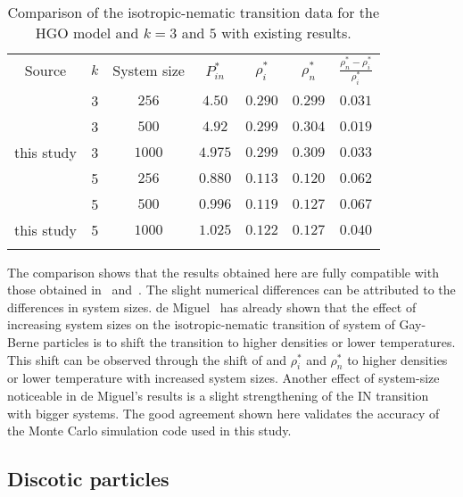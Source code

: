 \begin{table}
\centering
\begin{tabular}{||c||c||c||c||c||c||c||}
\hhline{|t:=:t:=:t:=:t:=:t:=:t:=:t:=:t|}
Source		&$k$	&System size	&$P^{*}_{in}$	&$\rho^{*}_i$	&$\rho^{*}_n$	&$\frac{\rho^{*}_n -\rho^{*}_i}{\rho^{*}_i}$	\\
\hhline{|:=::=::=::=::=::=::=:|}
\cite{PadillaVelasco97}	&3	&$256$	&$4.50$		&$0.290$	&$0.299$	&$0.031$	\\
\cite{DeMiguelDelRio01}	&3	&$500$	&$4.92$		&$0.299$	&$0.304$	&$0.019$	\\
this study		&3	&$1000$	&$4.975$	&$0.299$	&$0.309$	&$0.033$	\\
\hhline{|:=::=::=::=::=::=::=:|}
\cite{PadillaVelasco97}	&5	&$256$	&$0.880$	&$0.113$	&$0.120$	&$0.062$	\\
\cite{DeMiguelDelRio01}	&5	&$500$	&$0.996$	&$0.119$	&$0.127$	&$0.067$	\\
this study		&5	&$1000$	&$1.025$	&$0.122$	&$0.127$	&$0.040$	\\
\hhline{|b:=:b:=:b:=:b:=:b:=:b:=:b:=:b|}
\end{tabular}
\caption{Comparison of the isotropic-nematic transition data for the HGO model and $k=3$ and $5$
with existing results.}
\label{tble:HGOTransitionData_k3_5}
\end{table}

The comparison shows that the results obtained here are fully compatible with those obtained 
in~\cite{PadillaVelasco97} and~\cite{DeMiguelDelRio01}. The slight numerical differences can be
attributed to the differences in system sizes. 
de Miguel~\cite{DeMiguel92} has already shown that the effect of increasing system sizes on the
isotropic-nematic transition of system of Gay-Berne particles is to shift the transition to
higher densities or lower temperatures. This shift can be observed through the shift of \Ptwo
and $\rho^{*}_{i}$ and $\rho^{*}_{n}$ to higher densities or lower temperature with increased
system sizes. Another effect of system-size noticeable in de Miguel's results is a slight
strengthening of the IN transition with bigger systems.
The good agreement shown here validates the accuracy of the Monte Carlo simulation code 
used in this study.


\subsection{Discotic particles}

